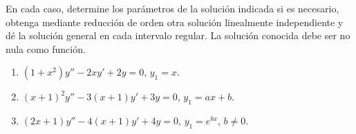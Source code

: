 En cada caso, determine los parámetros de la solución indicada si es necesario, obtenga mediante reducción de orden otra solución linealmente independiente y dé la solución general en cada intervalo regular. La solución conocida debe ser no nula como función.

\begin{enumerate}[label=(\alph*),ref=\alph*,leftmargin=*]
\item $(1+x^2)y''-2xy'+2y=0$, \quad $y_1=x$.
\item $(x+1)^2y''-3(x+1)y'+3y=0$, \quad $y_1=ax+b$.
\item $(2x+1)y''-4(x+1)y'+4y=0$, \quad $y_1=e^{bx}$, $b\ne0$.
\end{enumerate}
